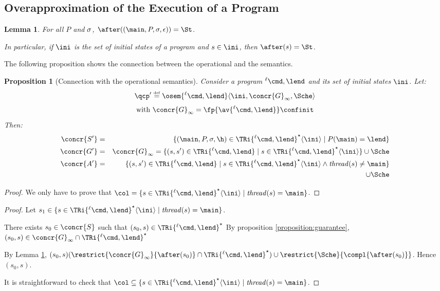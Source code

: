 \documentclass[12pt]{article}
\let\firstunion\cup
\let\firstinter\cap
\let\cup\firstunion
\let\cap\firstinter
\renewcommand{\subset}{\subseteq}
\newcommand{\egdef}{\stackrel{\text{\tiny def}}{=}}
\let\n\newcommand
\newcommand{\lab}{  {}^{\ell}}
\newcommand{\thread}{\mathit{thread}}
\newtheorem{proposition}{Proposition}
\newtheorem{lemma}{Lemma}
\begin{document}
\subsection{Overapproximation of the Execution of a Program}


\begin{lemma}\label{lemma:init}
 For all \(P\) and \(\sigma\), \(\after((\main,P,\m,\epsilon))=\St\).
 
 In particular, if \(\ini\) is the set of initial states of a program and \(s\in\ini\), then \(\after(s)=\St\).
\end{lemma}






The following proposition shows the connection between the operational and the \cname semantics.

\n{\labprog}{\lab }
\begin{proposition}[Connection with the operational semantics]\label{prop:coroc}
 Consider a program \(\labprog \cmd,\lend\) and its set of initial states \(\ini\).  
 Let:\vspace{-2mm}\[\qcp'\egdef\osem{\labprog \cmd,\lend}\langle \ini,\concr{G}_{\infty},\Sche\rangle\]\vspace{-6.5mm}\[\text{with } \concr{G}_{\infty} = \fp{\av{\labprog \cmd,\lend}}\confinit \vspace{-2mm}\]\noindent Then:\vspace{-4mm}
 \begin{eqnarray*}
    \concr{S'} &=&\{(\main,P,\m,\h)\in\TRi{\labprog \cmd,\lend}^{\star} \langle\ini\rangle\mid  P(\main)=\lend\} \\ 
  \concr{G'}&=&\concr{G}_{\infty}=\{(s,s')\in\TRi{\labprog \cmd,\lend} \mid   s\in\TRi{\labprog \cmd,\lend}^{\star} \langle\ini\rangle \}\cup\Sche\\
  \concr{A'}&=&
   \{(s,s')\in\TRi{\labprog \cmd,\lend} \mid  
   s\in\TRi{\labprog \cmd,\lend}^{\star} \langle\ini\rangle \wedge \thread(s)\neq\main \}\\
   & &
   \cup\Sche
 \end{eqnarray*}
\end{proposition}
\begin{proof}
 We only have to prove that \(\col=\{s\in\TRi{\labprog \cmd,\lend}^{\star}\langle\ini\rangle\mid \thread(s)=\main\}\).
\end{proof}
\begin{proof}
 Let \(s_1\in \{s\in\TRi{\labprog \cmd,\lend}^{\star}\langle\ini\rangle\mid \thread(s)=\main\}\).

There exists \(s_0\in\concr{S}\) such that \((s_0,s)\in\TRi{\labprog \cmd,\lend}^{\star} \)
By proposition \ref{proposition:guarantee}, \((s_0,s)\in\concr{G}_{\infty}\cap\TRi{\labprog \cmd,\lend}^{\star}\)

By Lemma \ref{lemma:init},
 \((s_0,s) (\restrict{{\concr{G}_{\infty}}}{\after(s_0)}\cap\TRi{\labprog \cmd,\lend}^{\star})\cup\restrict{\Sche}{\compl{\after(s_0)}} \).
Hence \((s_0,s)\).

It is straightforward to check that \(\col\subset\{s\in\TRi{\labprog \cmd,\lend}^{\star}\langle\ini\rangle\mid \thread(s)=\main\}\).
\end{proof}
\end{document}
